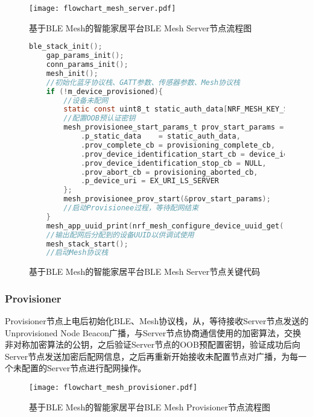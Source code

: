 \begin{figure}[H]
    \centering
    \texttt{[image: flowchart\_mesh\_server.pdf]}
    \caption{基于BLE Mesh的智能家居平台BLE Mesh Server节点流程图}
    \label{fig:flowchart_mesh_server}
\end{figure}

\begin{figure}[H]
    \centering
    \begin{lstlisting}[language=C]
    ble_stack_init();
    gap_params_init();
    conn_params_init();
    mesh_init();
    //初始化蓝牙协议栈、GATT参数、传感器参数、Mesh协议栈
    if (!m_device_provisioned){
        //设备未配网
        static const uint8_t static_auth_data[NRF_MESH_KEY_SIZE] = STATIC_AUTH_DATA;
        //配置OOB预认证密钥
        mesh_provisionee_start_params_t prov_start_params = {
            .p_static_data    = static_auth_data,
            .prov_complete_cb = provisioning_complete_cb,
            .prov_device_identification_start_cb = device_identification_start_cb,
            .prov_device_identification_stop_cb = NULL,
            .prov_abort_cb = provisioning_aborted_cb,
            .p_device_uri = EX_URI_LS_SERVER
        };
        mesh_provisionee_prov_start(&prov_start_params);
        //启动Provisionee过程，等待配网结束
    }
    mesh_app_uuid_print(nrf_mesh_configure_device_uuid_get());
    //输出配网后分配到的设备UUID以供调试使用
    mesh_stack_start();
    //启动Mesh协议栈
    \end{lstlisting}
    \caption{基于BLE Mesh的智能家居平台BLE Mesh Server节点关键代码}
    \label{fig:code_mesh_server}
\end{figure}

\subsubsection{Provisioner}
Provisioner节点上电后初始化BLE、Mesh协议栈，从，等待接收Server节点发送的Unprovisioned Node Beacon广播，与Server节点协商通信使用的加密算法，交换非对称加密算法的公钥，之后验证Server节点的OOB预配置密钥，验证成功后向Server节点发送加密后配网信息，之后再重新开始接收未配置节点对广播，为每一个未配置的Server节点进行配网操作。

\begin{figure}[H]
    \centering
    \texttt{[image: flowchart\_mesh\_provisioner.pdf]}
    \caption{基于BLE Mesh的智能家居平台BLE Mesh Provisioner节点流程图}
    \label{fig:flowchart_mesh_provisioner}
\end{figure}

